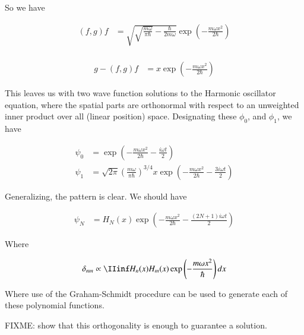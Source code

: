 So we have

\begin{align*}
(f,g) f 
&= 
\sqrt{\sqrt{\frac{m \omega}{\pi \hbar}} - \frac{ \hbar}{ 2 m \omega} }
\exp\left( - \frac{m \omega x^2 }{2 \hbar} \right) \\
\end{align*}

\begin{align*}
g - (f,g) f 
&= x \exp\left( - \frac{m \omega x^2}{2 \hbar} \right)
\end{align*}

This leaves us with two wave function solutions to the Harmonic oscillator equation, where the spatial parts are orthonormal with respect to an unweighted inner product
over all (linear position) space.  Designating these $\phi_0$, and $\phi_1$, we have

\begin{align*}
\psi_0 &= \exp\left( - \frac{m \omega x^2}{2 \hbar} - \frac{i \omega t }{ 2} \right) \\
\psi_1 &= \sqrt{2\pi} \left(\frac{m \omega}{\pi\hbar}\right)^{3/4} x \exp\left( - \frac{m \omega x^2}{2 \hbar} - \frac{3 i \omega t }{ 2} \right)
\end{align*}

Generalizing, the pattern is clear.  We should have

\begin{align*}
\psi_N &= H_N(x) \exp\left( - \frac{m \omega x^2}{2 \hbar} - \frac{(2N + 1) i \omega t }{ 2} \right)
\end{align*}

Where 

\begin{align*}
\delta_{nm} \propto \IIinf H_n(x) H_m(x) \exp\left( - \frac{m \omega x^2}{\hbar} \right) dx
\end{align*}

Where use of the Graham-Schmidt procedure can be used to generate each of these polynomial functions.

FIXME: show that this orthogonality is enough to guarantee a solution.

%
%

%
